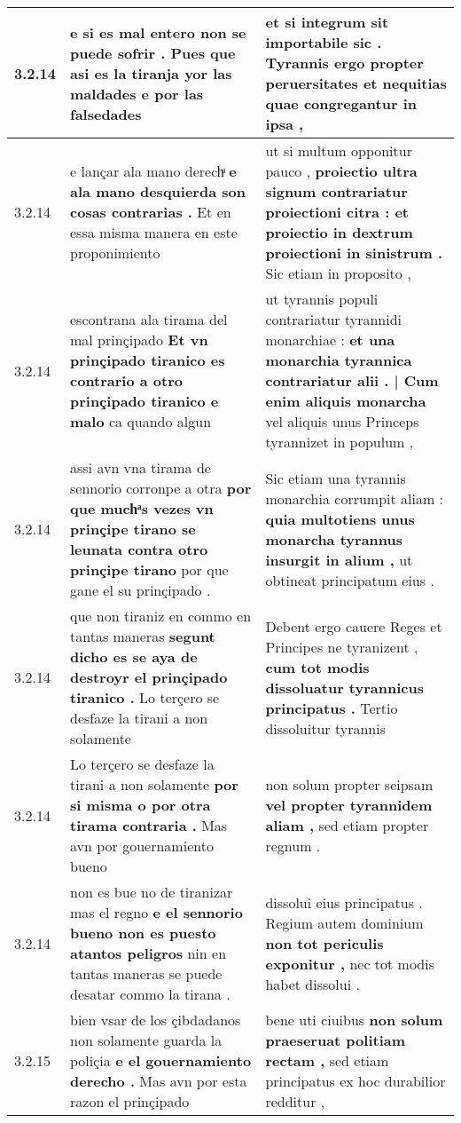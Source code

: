 \begin{tabular}{|p{1cm}|p{6.5cm}|p{6.5cm}|}
3.2.14 & e si es mal entero non se puede sofrir . \textbf{ Pues que asi es la tiranja yor las maldades } e por las falsedades & et si integrum sit importabile sic . \textbf{ Tyrannis ergo propter peruersitates et nequitias } quae congregantur in ipsa , \\\hline
3.2.14 & e lançar ala mano derechͣ \textbf{ e ala mano desquierda son cosas contrarias . } Et en essa misma manera en este proponimiento & ut si multum opponitur pauco , \textbf{ proiectio ultra signum contrariatur proiectioni citra : et proiectio in dextrum proiectioni in sinistrum . } Sic etiam in proposito , \\\hline
3.2.14 & escontrana ala tirama del mal prinçipado \textbf{ Et vn prinçipado tiranico es contrario a otro prinçipado tiranico e malo } ca quando algun & ut tyrannis populi contrariatur tyrannidi monarchiae : \textbf{ et una monarchia tyrannica contrariatur alii . | Cum enim aliquis monarcha } vel aliquis unus Princeps tyrannizet in populum , \\\hline
3.2.14 & assi avn vna tirama de sennorio corronpe a otra \textbf{ por que muchͣs vezes vn prinçipe tirano se leunata contra otro prinçipe tirano } por que gane el su prinçipado . & Sic etiam una tyrannis monarchia corrumpit aliam : \textbf{ quia multotiens unus monarcha tyrannus insurgit in alium , } ut obtineat principatum eius . \\\hline
3.2.14 & que non tiraniz en commo en tantas maneras \textbf{ segunt dicho es se aya de destroyr el prinçipado tiranico . } Lo terçero se desfaze la tirani a non solamente & Debent ergo cauere Reges et Principes ne tyranizent , \textbf{ cum tot modis dissoluatur tyrannicus principatus . } Tertio dissoluitur tyrannis \\\hline
3.2.14 & Lo terçero se desfaze la tirani a non solamente \textbf{ por si misma o por otra tirama contraria . } Mas avn por gouernamiento bueno & non solum propter seipsam \textbf{ vel propter tyrannidem aliam , } sed etiam propter regnum . \\\hline
3.2.14 & non es bue no de tiranizar mas el regno \textbf{ e el sennorio bueno non es puesto atantos peligros } nin en tantas maneras se puede desatar commo la tirana . & dissolui eius principatus . Regium autem dominium \textbf{ non tot periculis exponitur , } nec tot modis habet dissolui . \\\hline
3.2.15 & bien vsar de los çibdadanos non solamente guarda la poliçia \textbf{ e el gouernamiento derecho . } Mas avn por esta razon el prinçipado & bene uti ciuibus \textbf{ non solum praeseruat politiam rectam , } sed etiam principatus ex hoc durabilior redditur , \\\hline

\end{tabular}
